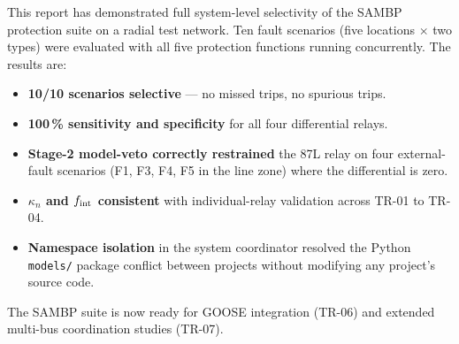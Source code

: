 \documentclass[12pt,a4paper]{article}
\newcommand{\kn}{\kappa_n}
\newcommand{\fint}{f_{\rm int}}
\begin{document}
This report has demonstrated full system-level selectivity of the SAMBP
protection suite on a radial test network.  Ten fault scenarios (five
locations $\times$ two types) were evaluated with all five protection
functions running concurrently.  The results are:

\begin{itemize}
  \item \textbf{10/10 scenarios selective} --- no missed trips, no
        spurious trips.
  \item \textbf{100\,\% sensitivity and specificity} for all four
        differential relays.
  \item \textbf{Stage-2 model-veto correctly restrained} the 87L relay
        on four external-fault scenarios (F1, F3, F4, F5 in the line
        zone) where the differential is zero.
  \item \textbf{$\kn$ and $\fint$ consistent} with individual-relay
        validation across TR-01 to TR-04.
  \item \textbf{Namespace isolation} in the system coordinator resolved
        the Python \texttt{models/} package conflict between projects
        without modifying any project's source code.
\end{itemize}

The SAMBP suite is now ready for GOOSE integration (TR-06) and extended
multi-bus coordination studies (TR-07).




\end{document}
